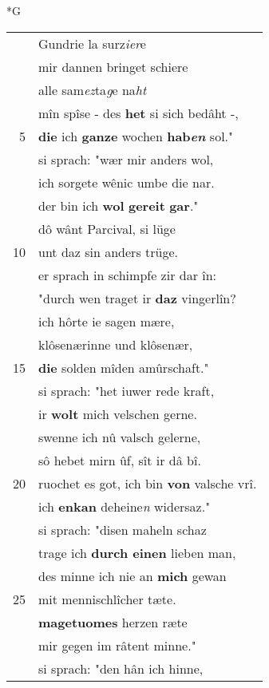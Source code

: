 \documentclass[8pt,a4paper,notitlepage]{article}
\begin{document}
\newpage
\begin{table}[ht]
\begin{minipage}[t]{0.5\linewidth}
\small
\begin{center}*G
\end{center}
\begin{tabular}{rl}
 & Gundrie la surz\textit{ier}e\\ 
 & mir dannen bringet schiere\\ 
 & alle sam\textit{ez}ta\textit{g}e na\textit{ht}\\ 
 & mîn spîse - des \textbf{het} si sich bedâht -,\\ 
5 & \textbf{die} ich \textbf{ganze} wochen \textbf{hab\textit{en}} sol."\\ 
 & si sprach: "wær mir anders wol,\\ 
 & ich sorgete wênic umbe die nar.\\ 
 & der bin ich \textbf{wol} \textbf{gereit} \textbf{gar}."\\ 
 & dô wânt Parcival, si lüge\\ 
10 & unt daz sin anders trüge.\\ 
 & er sprach in schimpfe zir dar în:\\ 
 & "durch wen traget ir \textbf{daz} vingerlîn?\\ 
 & ich hôrte ie sagen mære,\\ 
 & klôsenærinne und klôsenær,\\ 
15 & \textbf{die} solden mîden amûrschaft."\\ 
 & si sprach: "het iuwer rede kraft,\\ 
 & ir \textbf{wolt} mich velschen gerne.\\ 
 & swenne ich nû valsch gelerne,\\ 
 & sô hebet mirn ûf, sît ir dâ bî.\\ 
20 & ruochet es got, ich bin \textbf{von} valsche vrî.\\ 
 & ich \textbf{enkan} deheine\textit{n} widersaz."\\ 
 & si sprach: "disen maheln schaz\\ 
 & trage ich \textbf{durch einen} lieben man,\\ 
 & des minne ich nie an \textbf{mich} gewan\\ 
25 & mit mennischlîcher tæte.\\ 
 & \textbf{magetuomes} herzen ræte\\ 
 & mir gegen im râtent minne."\\ 
 & si sprach: "den hân ich hinne,\\ 

\end{tabular}
\end{minipage}
\end{table}
\end{document}
